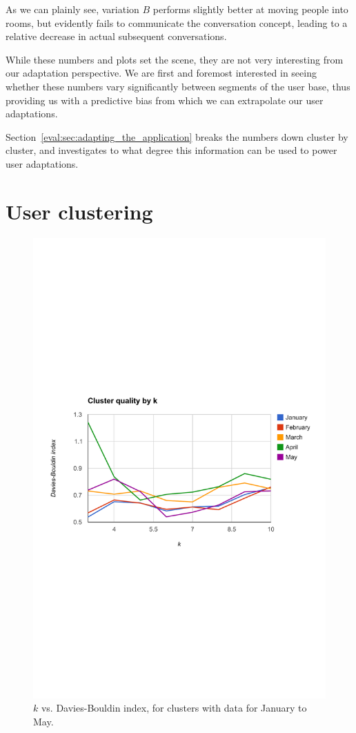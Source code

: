 As we can plainly see, variation $B$ performs slightly better at moving people into rooms, but evidently fails to communicate the conversation concept, leading to a relative decrease in actual subsequent conversations.

While these numbers and plots set the scene, they are not very interesting from our adaptation perspective. We are first and foremost interested in seeing whether these numbers vary significantly between segments of the user base, thus providing us with a predictive bias from which we can extrapolate our user adaptations.

Section~\ref{eval:sec:adapting_the_application} breaks the numbers down cluster by cluster, and investigates to what degree this information can be used to power user adaptations.

\section{User clustering} %
\label{eval:sec:clustering}

\begin{figure}[h]
  \centering
    \includegraphics[width=\textwidth]{Figures/plots/k-vs-db/jan-may}
    \caption{$k$ vs. Davies-Bouldin index, for clusters with data for January to May.}
    \label{fig:k_vs_db}
\end{figure}

